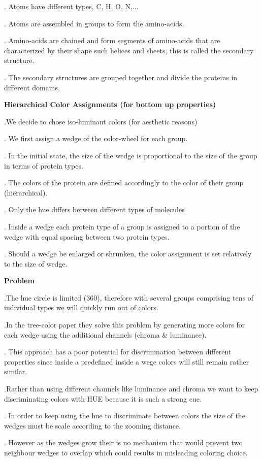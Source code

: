 \documentclass[review,journal]{vgtc}         %
\begin{document}
. Atoms have different types, C, H, O, N,...

. Atoms are assembled in groups to form the amino-acids.

. Amino-acids are chained and form segments of amino-acids that are characterized by their shape such helices and sheets, this is called the secondary structure.

. The secondary structures are grouped together and divide the proteins in different domains.


\textbf{Hierarchical Color Assignments (for bottom up properties)}

.We decide to chose iso-luminant colors (for aesthetic reasons)

. We first assign a wedge of the color-wheel for each group.

. In the initial state, the size of the wedge is proportional to the size of the group in terms of protein types.

. The colors of the protein are defined accordingly to the color of their group (hierarchical).

. Only the hue differs between different types of molecules

. Inside a wedge each protein type of a group is assigned to a portion of the wedge with equal spacing between two protein types.

. Should a wedge be enlarged or shrunken, the color assignment is set relatively to the size of wedge.


\textbf{Problem}

.The hue circle is limited (360), therefore with several groups comprising tens of individual types we will quickly run out of colors.

.In the tree-color paper they solve this problem by generating more colors for each wedge using the additional channels (chroma & luminance).

. This approach has a poor potential for discrimination between different properties since inside a predefined inside a wege colors will still remain rather similar. 

.Rather than using different channels like luminance and chroma we want to keep discriminating colors with HUE because it is such a strong cue.

. In order to keep using the hue to discriminate between colors the size of the wedges must be scale according to the zooming distance.

. However as the wedges grow their is no mechanism that would prevent two neighbour wedges to overlap which could results in misleading coloring choice.
\end{document}
